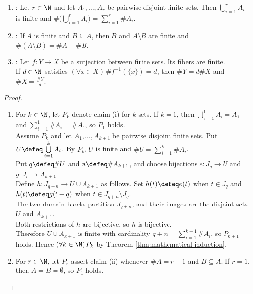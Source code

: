 \begin{proposition} \label{prop:addition-subtraction-and-division-principles} 
\begin{enumerate}[label=(\roman*)]
\setlength{\itemsep}{0pt}
\item {}: Let $r\in\N$ and let $A_1,\ldots,A_r$ be pairwise disjoint finite sets. Then $\bigcup\limits_{i=1}^{r}A_i$ is finite and $\#\bigl(\bigcup\limits_{i=1}^{r}A_i\bigr)=\sum\limits_{i=1}^{r}\#A_i$.
\item {}: If $A$ is finite and $B\subseteq A$, then $B$ and $A\setminus B$ are finite and $\#(A\setminus B)=\#A-\#B$.
\item {}: Let $f:Y\to X$ be a surjection between finite sets. Its fibers are finite.\\
If $d\in\N$ satisfies $(\forall x\in X)\,\#f^{-1}(\{x\})=d$, then $\#Y=d\#X$ and $\#X=\frac{\#Y}{d}$.
\end{enumerate}
\begin{proof}
\begin{enumerate}[label=(\roman*)]
\setlength{\itemsep}{0pt}
\item For $k\in\N$, let $P_k$ denote claim (i) for $k$ sets. If $k=1$, then $\bigcup\limits_{i=1}^{1}A_i=A_1$ and $\sum\limits_{i=1}^{1}\#A_i=\#A_1$, so $P_1$ holds.\\
Assume $P_k$ and let $A_1,\ldots,A_{k+1}$ be pairwise disjoint finite sets. Put $U\defeq\bigcup\limits_{i=1}^{k}A_i$. By $P_k$, $U$ is finite and $\#U=\sum\limits_{i=1}^{k}\#A_i$.\\
Put $q\defeq\#U$ and $n\defeq\#A_{k+1}$, and choose bijections $e:J_q\to U$ and $g:J_n\to A_{k+1}$.\\
Define $h:J_{q+n}\to U\cup A_{k+1}$ as follows. Set $h(t)\defeq e(t)$ when $t\in J_q$ and $h(t)\defeq g(t-q)$ when $t\in J_{q+n}\setminus J_q$.\\
The two domain blocks partition $J_{q+n}$, and their images are the disjoint sets $U$ and $A_{k+1}$.\\
Both restrictions of $h$ are bijective, so $h$ is bijective.\\
Therefore $U\cup A_{k+1}$ is finite with cardinality $q+n=\sum\limits_{i=1}^{k+1}\#A_i$, so $P_{k+1}$ holds. Hence $(\forall k\in\N)\,P_k$ by Theorem \ref{thm:mathematical-induction}.
\item For $r\in\N$, let $P_r$ assert claim (ii) whenever $\#A=r-1$ and $B\subseteq A$. If $r=1$, then $A=B=\emptyset$, so $P_1$ holds.\\

\end{enumerate}
\end{proof}
\end{proposition}
